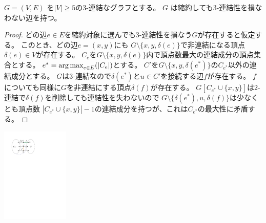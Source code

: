 \begin{lemma}\label{lemma:contractions_preserve_3_connectivity}
$G = (V, E)$ を$|V| \geq 5$の$3$-連結なグラフとする。
$G$ は縮約しても$3$-連結性を損なわない辺を持つ。
\end{lemma}



\vspace*{-\intextsep}
\begin{paracol}{2}
\begin{proof}
どの辺$e\in E$を縮約対象に選んでも$3$-連結性を損なう$G$が存在すると仮定する。
このとき、どの辺$e=(x, y)$にも
$G \setminus \{x, y, \delta(e)\}$で非連結になる頂点$\delta(e)\in V$が存在する。
$C_e$を$G \setminus \{x, y, \delta(e)\}$内で頂点数最大の連結成分の頂点集合とする。
%
%
$e^* = \operatorname*{arg\,max}_{e \in E} (|C_e|)$とする。
$C'$を$G\setminus \{x, y, \delta(e^*)\}$の$C_{e^*}$以外の連結成分とする。
$G$は$3$-連結なので$\delta(e^*)$と$u \in C'$を接続する辺$f$が存在する。
$f$についても同様に$G$を非連結にする頂点$\delta(f)$が存在する。
$G[C_{e^*} \cup \{x, y\}]$は$2$-連結で$\delta(f)$を削除しても連結性を失わないので
$G\setminus \{\delta({e^*}), u, \delta(f)\}$は少なくとも頂点数
$|C_{e^*} \cup \{x, y\}|-1$の連結成分を持つが、これは$C_{e^*}$の最大性に矛盾する。
\end{proof}

\switchcolumn
\vspace{1\intextsep}
\centering


\includegraphics[width=0.24\textwidth]{figures/contractions_and_3_connectivity_03.pdf}
\end{paracol}




